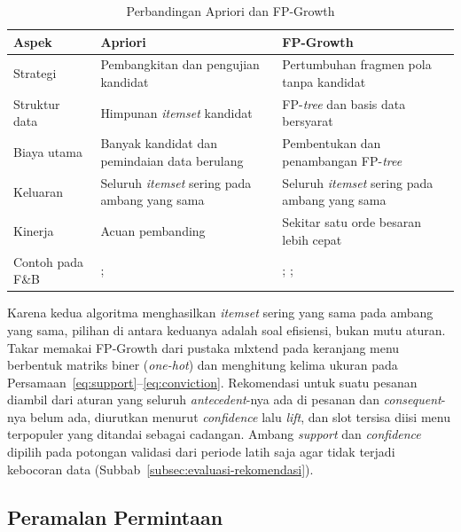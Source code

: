 \begin{table}[!htb]
\centering
\caption{Perbandingan Apriori dan FP-Growth}
\label{tab:apriori-fpgrowth}
{\small
{}
\begin{tabular}{@{}>{\raggedright\arraybackslash}p{2.9cm}>{\raggedright\arraybackslash}p{5.1cm}>{\raggedright\arraybackslash}p{5.4cm}@{}}
\toprule
\textbf{Aspek} & \textbf{Apriori} & \textbf{FP-Growth} \\
\midrule
Strategi & Pembangkitan dan pengujian kandidat & Pertumbuhan fragmen pola tanpa kandidat \\
Struktur data & Himpunan \textit{itemset} kandidat & FP-\textit{tree} dan basis data bersyarat \\
Biaya utama & Banyak kandidat dan pemindaian data berulang & Pembentukan dan penambangan FP-\textit{tree} \\
Keluaran & Seluruh \textit{itemset} sering pada ambang yang sama & Seluruh \textit{itemset} sering pada ambang yang sama \\
Kinerja & Acuan pembanding & Sekitar satu orde besaran lebih cepat \\
Contoh pada F\&B & \citet*{nasution2025application}; \citet*{pratama2026automatic} & \citet*{fadillah2021data}; \citet*{pratama2025food}; \citet*{sihombing2026analisis} \\
\bottomrule
\end{tabular}}
\end{table}

Karena kedua algoritma menghasilkan \textit{itemset} sering yang sama pada ambang yang sama, pilihan di antara keduanya adalah soal efisiensi, bukan mutu aturan. Takar memakai FP-Growth dari pustaka mlxtend \citep*{raschka2018mlxtend} pada keranjang menu berbentuk matriks biner (\textit{one-hot}) dan menghitung kelima ukuran pada Persamaan~\eqref{eq:support}--\eqref{eq:conviction}. Rekomendasi untuk suatu pesanan diambil dari aturan yang seluruh \textit{antecedent}-nya ada di pesanan dan \textit{consequent}-nya belum ada, diurutkan menurut \textit{confidence} lalu \textit{lift}, dan slot tersisa diisi menu terpopuler yang ditandai sebagai cadangan. Ambang \textit{support} dan \textit{confidence} dipilih pada potongan validasi dari periode latih saja agar tidak terjadi kebocoran data (Subbab~\ref{subsec:evaluasi-rekomendasi}).

\subsection{Peramalan Permintaan}
\label{subsec:peramalan}

